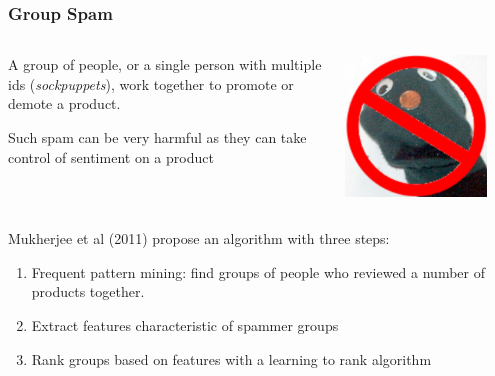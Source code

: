 \documentclass[t]{beamer}
\begin{document}
\begin{frame} \frametitle{Group Spam} %


\begin{columns}[T]

\begin{column}{0.7\textwidth}
A group of people, or a single person with multiple ids
(\textit{sockpuppets}), work together to promote or demote a
product. 

\vfill
Such spam can be very harmful as they can take control of sentiment on
a product 
\end{column}

\begin{column}{0.3\textwidth}
\begin{center}
     \includegraphics[width=0.85\textwidth]{sockpuppet}
\end{center}
\end{column}

\end{columns}

\vfill
Mukherjee et al (2011) propose an algorithm with three steps:
\begin{enumerate}
\item Frequent pattern mining: find groups of people who reviewed a number of products
together. 
\item Extract features characteristic of spammer groups
\item Rank groups based on features with a learning to rank algorithm
\end{enumerate}


\end{frame}
\end{document}
